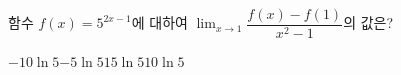 함수 $f(x)=5^{2x-1}$에 대하여 $\displaystyle\lim_{x\to 1}\dfrac{f(x)-f(1)}{x^2-1}$의 값은?
\begin{choices32}{$-10\ln 5$}{$-5\ln 5$}{$1$}{$5\ln 5$}{$10\ln 5$}\end{choices32}
